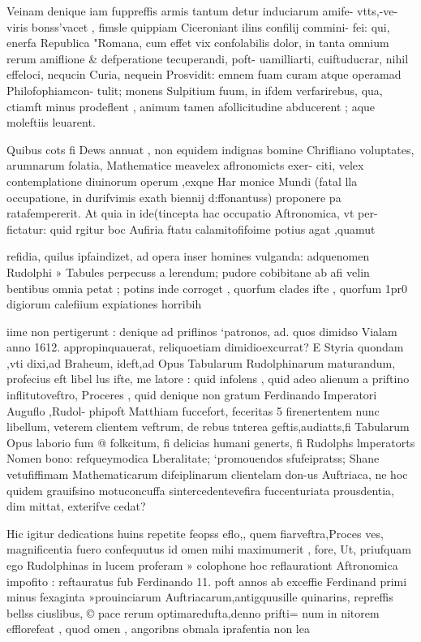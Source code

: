 \documentclass{article}
\begin{document}
{Veinam denique iam fuppreffis armis tantum detur induciarum amife-
vtts,-ve-viris bonss'vacet , fimsle quippiam Ciceroniant ilins confilij commini-
fei: qui, enerfa Republica "Romana, cum effet vix confolabilis dolor, in
tanta omnium rerum amiflione & defperatione tecuperandi, poft-
uamilliarti, cuiftuducrar, nihil effeloci, nequcin Curia, nequein
Prosvidit: emnem fuam curam atque operamad Philofophiamcon-
tulit; monens Sulpitium fuum, in ifdem verfarirebus, qua, ctiamft
minus prodeflent , animum tamen afollicitudine abducerent ; aque
moleftiis leuarent.

Quibus cots fi Dews annuat , non equidem indignas bomine Chrifliano
voluptates, arumnarum folatia, Mathematice meavelex aflronomicts exer-
citi, velex contemplatione diuinorum operum ,exqne Har monice Mundi
(fatal lla occupatione, in durifvimis exath biennij d:ffonantuss) proponere pa~
ratafempererit. At quia in ide(tincepta hac occupatio Aftronomica, vt per-
fictatur: quid rgitur boc Aufiria ftatu calamitofifoime potius agat ,quamut

refidia, quilus ipfaindizet, ad opera inser homines vulganda:  adquenomen
Rudolphi » Tabules perpecuss a lerendum; pudore cobibitane ab afi velin~
bentibus omnia petat ; potins inde corroget , quorfum clades ifte , quorfum 1pr0~
digiorum calefiium expiationes horribih{iime non pertigerunt : denique ad
priflinos ‘patronos, ad. quos dimidso Vialam anno 1612. appropinquauerat,
reliquoetiam dimidioexcurrat? E Styria quondam ,vti dixi,ad Braheum,
ideft,ad Opus Tabularum Rudolphinarum maturandum, profecius eft libel
lus ifte, me latore : quid infolens , quid adeo alienum a priftino inflitutoveftro,
Proceres , quid denique non gratum Ferdinando Imperatori Auguflo ,Rudol-
phipoft Matthiam fuccefort, feceritas 5 firenertentem nunc libellum, veterem
clientem veftrum, de rebus tnterea geftis,audiatts,fi Tabularum Opus laborio
fum @ folkcitum, fi delicias humani generts, fi Rudolphs lmperatorts Nomen
bono: refqueymodica Lberalitate; ‘promouendos sfufeipratss; Shane vetufiffimam
Mathematicarum difeiplinarum clientelam don-us Auftriaca, ne hoc quidem
grauifsino motuconcuffa sintercedentevefira fuccenturiata prousdentia, dim
mittat, exterifve cedat?

Hic igitur dedications huins repetite feopss eflo,, quem fiarveftra,Proces
ves, magnificentia fuero confequutus id omen mihi maximumerit , fore, Ut,
priufquam ego Rudolphinas in lucem proferam » colophone hoc reflaurationt
Aftronomica impofito : reftauratus fub Ferdinando 11. poft annos ab exceffie
Ferdinand primi minus fexaginta »prouinciarum Auftriacarum,antigquusille
quinarins, repreffis bellss ciuslibus, © pace rerum optimaredufta,denno prifti=
num in nitorem efflorefeat , quod omen , angoribns obmala iprafentia non lea

}}
\end{document}
